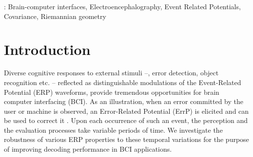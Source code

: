 \documentclass[12pt]{iopart}
\begin{document}
%
\vspace{2pc}
: Brain-computer interfaces, Electroencephalography, Event Related Potentials, Covariance, Riemannian geometry
%
%
% 
%




\section{Introduction}
\label{sec:intro}

Diverse cognitive responses to external stimuli --,
error detection, object recognition etc. -- reflected as distinguishable modulations of
the Event-Related Potential (ERP) waveforms, provide tremendous opportunities for brain computer interfacing (BCI). 
As an illustration, when an error committed by
the user or machine is observed, an Error-Related Potential (ErrP) is elicited
and can be used to correct it \cite{chavarriaga_adaptation_2010}.
Upon each occurrence of such an event, the perception 
and the evaluation processes take variable periods of time.
We investigate the robustness of various ERP properties to these temporal
variations for the purpose of improving decoding performance in BCI applications.
\end{document}
